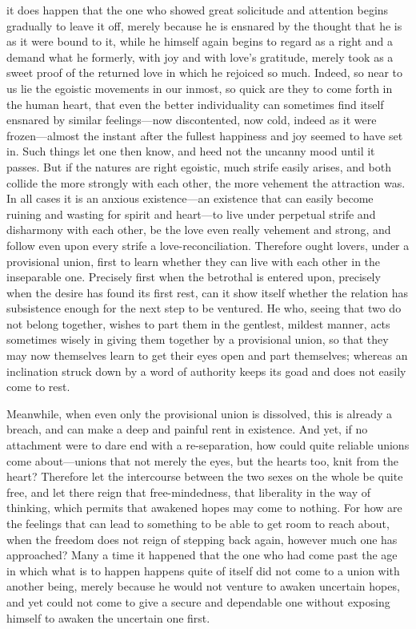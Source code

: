 \documentclass[12pt,a4paper]{book}
\begin{document}
it does happen that the one who showed great solicitude and attention
begins gradually to leave it off, merely because he is ensnared by the
thought that he is as it were bound to it, while he himself again begins to
regard as a right and a demand what he formerly, with joy and with love's
gratitude, merely took as a sweet proof of the returned love in which he
rejoiced so much. Indeed, so near to us lie the egoistic movements in our
inmost, so quick are they to come forth in the human heart, that even the
better individuality can sometimes find itself ensnared by similar
feelings---now discontented, now cold, indeed as it were frozen---almost the
instant after the fullest happiness and joy seemed to have set in. Such
things let one then know, and heed not the uncanny mood until it passes.
But if the natures are right egoistic, much strife easily arises, and both
collide the more strongly with each other, the more vehement the attraction
was. In all cases it is an anxious existence---an existence that can easily
become ruining and wasting for spirit and heart---to live under perpetual
strife and disharmony with each other, be the love even really vehement and
strong, and follow even upon every strife a love-reconciliation. Therefore
ought lovers, under a provisional union, first to learn whether they can
live with each other in the inseparable one. Precisely first when the
betrothal is entered upon, precisely when the desire has found its first
rest, can it show itself whether the relation has subsistence enough for the
next step to be ventured. He who, seeing that two do not belong together,
wishes to part them in the gentlest, mildest manner, acts sometimes wisely
in giving them together by a provisional union, so that they may now
themselves learn to get their eyes open and part themselves; whereas an
inclination struck down by a word of authority keeps its goad and does not
easily come to rest.

Meanwhile, when even only the provisional union is dissolved, this is
already a breach, and can make a deep and painful rent in existence. And
yet, if no attachment were to dare end with a re-separation, how could
quite reliable unions come about---unions that not merely the eyes, but the
hearts too, knit from the heart? Therefore let the intercourse between the
two sexes on the whole be quite free, and let there reign that
free-mindedness, that liberality in the way of thinking, which permits that
awakened hopes may come to nothing. For how are the feelings that can lead
to something to be able to get room to reach about, when the freedom does
not reign of stepping back again, however much one has approached? Many a
time it happened that the one who had come past the age in which what is to
happen happens quite of itself did not come to a union with another being,
merely because he would not venture to awaken uncertain hopes, and yet
could not come to give a secure and dependable one without exposing himself
to awaken the uncertain one first.
\end{document}
